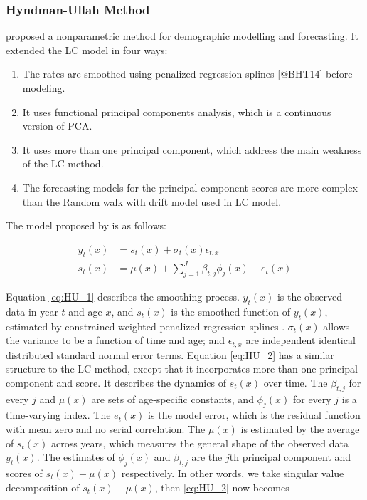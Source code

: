 \documentclass[11pt,a4paper,]{article}
\begin{document}
\subsubsection{\texorpdfstring{Hyndman-Ullah Method
\label{sec:HU}}{Hyndman-Ullah Method }}\label{hyndman-ullah-method}

\textcite{HU07} proposed a nonparametric method for demographic
modelling and forecasting. It extended the LC model in four ways:

\begin{enumerate}
\item The rates are smoothed using penalized regression splines [@BHT14] before modeling.
\item It uses functional principal components analysis, which is a continuous version of PCA.
\item It uses more than one principal component, which address the main weakness of the LC method.
\item The forecasting models for the principal component scores are more complex than the Random walk with drift model used in LC model.
\end{enumerate}

The model proposed by \textcite{HU07} is as follows: \vspace{-.3in}

\begin{align}
  y_t(x) & = s_t(x) + \sigma_t(x)\epsilon_{t,x}\label{eq:HU_1}\\
  s_t(x) & = \mu(x) + \sum_{j=1}^{J}\beta_{t,j}\phi_j(x) + e_t(x)\label{eq:HU_2}
\end{align}

Equation \eqref{eq:HU_1} describes the smoothing process. \(y_t(x)\) is
the observed data in year \(t\) and age \(x\), and \(s_t(x)\) is the
smoothed function of \(y_t(x)\), estimated by constrained weighted
penalized regression splines \autocite{BHT14}. \(\sigma_t(x)\) allows
the variance to be a function of time and age; and \(\epsilon_{t,x}\)
are independent identical distributed standard normal error terms.
Equation \eqref{eq:HU_2} has a similar structure to the LC method,
except that it incorporates more than one principal component and score.
It describes the dynamics of \(s_t(x)\) over time. The \(\beta_{t,j}\)
for every \(j\) and \(\mu(x)\) are sets of age-specific constants, and
\(\phi_j(x)\) for every \(j\) is a time-varying index. The \(e_t(x)\) is
the model error, which is the residual function with mean zero and no
serial correlation. The \(\mu(x)\) is estimated by the average of
\(s_t(x)\) across years, which measures the general shape of the
observed data \(y_t(x)\). The estimates of \(\phi_j(x)\) and
\(\beta_{t,j}\) are the \(j\)th principal component and scores of
\(s_t(x)-\mu(x)\) respectively. In other words, we take singular value
decomposition of \(s_t(x)-\mu(x)\), then \eqref{eq:HU_2} now becomes
\vspace{-.2in}
\end{document}

